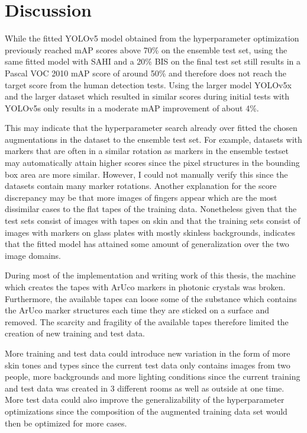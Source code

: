 \documentclass[10pt]{book}
\begin{document}
\section{Discussion}

While the fitted \ac{YOLO}v5 model obtained from the hyperparameter optimization previously reached \ac{mAP} scores above 70\% on the ensemble test set, using the same fitted model with \ac{SAHI} and a 20\% \ac{BIS} on the final test set still results in a Pascal VOC 2010 \ac{mAP} score of around 50\% and therefore does not reach the target score from the human detection tests. Using the larger model \ac{YOLO}v5x and the larger dataset which resulted in similar scores during initial tests with \ac{YOLO}v5s only results in a moderate \ac{mAP} improvement of about 4\%.

This may indicate that the hyperparameter search already over fitted the chosen augmentations in the dataset to the ensemble test set. For example, datasets with markers that are often in a similar rotation as markers in the ensemble testset may automatically attain higher scores since the pixel structures in the bounding box area are more similar. However, I could not manually verify this since the datasets contain many marker rotations. Another explanation for the score discrepancy may be that more images of fingers appear which are the most dissimilar cases to the flat tapes of the training data. %
Nonetheless given that the test sets consist of images with tapes on skin and that the training sets consist of images with markers on glass plates with mostly skinless backgrounds, indicates that the fitted model has attained some amount of generalization over the two image domains.

During most of the implementation and writing work of this thesis, the machine which creates the tapes with \ac{ArUco} markers in photonic crystals was broken. Furthermore, the available tapes can loose some of the substance which contains the \ac{ArUco} marker structures each time they are sticked on a surface and removed. The scarcity and fragility of the available tapes therefore limited the creation of new training and test data. 

More training and test data could introduce new variation in the form of more skin tones and types since the current test data only contains images from two people, more backgrounds and more lighting conditions since the current training and test data was created in 3 different rooms as well as outside at one time. More test data could also improve the generalizability of the hyperparameter optimizations since the composition of the augmented training data set would then be optimized for more cases.
\end{document}
